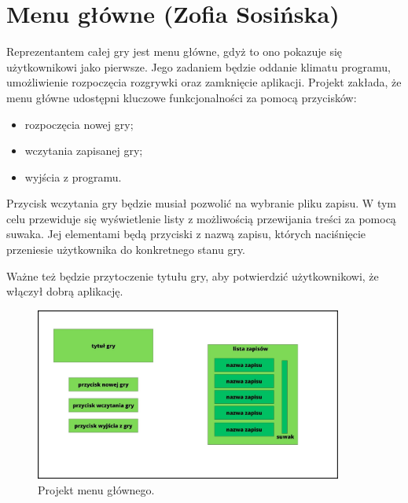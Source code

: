 \section{Menu główne (Zofia Sosińska)}\label{chap:menu_main}
Reprezentantem całej gry jest menu główne, gdyż to ono pokazuje się użytkownikowi jako pierwsze. Jego zadaniem będzie oddanie klimatu programu,
 umożliwienie rozpoczęcia rozgrywki oraz zamknięcie aplikacji.
Projekt zakłada, że menu główne udostępni kluczowe funkcjonalności za pomocą przycisków:
\begin{itemize}
    \item rozpoczęcia nowej gry;
    \item wczytania zapisanej gry;
    \item wyjścia z programu.
\end{itemize}

Przycisk wczytania gry będzie musiał pozwolić na wybranie pliku zapisu. W tym celu przewiduje się wyświetlenie listy
z możliwością przewijania treści za pomocą suwaka. Jej elementami będą przyciski z nazwą zapisu, których naciśnięcie przeniesie 
użytkownika do konkretnego stanu gry.

Ważne też będzie przytoczenie tytułu gry, aby potwierdzić użytkownikowi, że włączył dobrą aplikację.
\begin{figure}[htbp]
    \centering
    \includegraphics[width=0.9\textwidth]{images/ui/ui_prooj_menu.jpg}
    \caption{Projekt menu głównego.
    }\label{fig:compass}
\end{figure}
